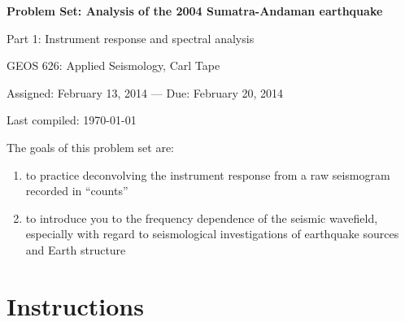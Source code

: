 \documentclass[11pt,titlepage,fleqn]{article}
\begin{document}

\begin{center}

{\large \bf Problem Set: Analysis of the 2004 Sumatra-Andaman earthquake

Part 1: Instrument response and spectral analysis

}

GEOS 626: Applied Seismology, Carl Tape

Assigned: February 13, 2014 --- Due: February 20, 2014

Last compiled: \today

\end{center}


\bigskip
\noindent
The goals of this problem set are:
%
\begin{enumerate}
\item to practice deconvolving the instrument response from a raw seismogram recorded in ``counts''
\item to introduce you to the frequency dependence of the seismic wavefield, especially with regard to seismological investigations of earthquake sources and Earth structure
\end{enumerate}

\section*{Instructions}
\end{document}
